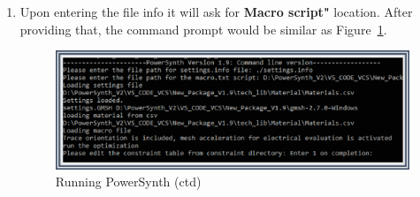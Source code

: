 \documentclass[11pt]{article}
\begin{document}
\begin{enumerate}
\begin{lstlisting} [caption={Settings file content},label={settings}]
    \end{lstlisting}
    
    \item Upon entering the file info it will ask for \textbf{Macro script"} location. After providing that, the command prompt would be similar as Figure~\ref{macro_6}.
    
    \begin{figure}[H]
    \centering
    \includegraphics[width=\linewidth ]{figs/v_1.9_figs/cmd_re_2.eps}
    \caption{Running PowerSynth (ctd)}
    \label{macro_6}
    \end{figure}
    

\end{enumerate}
\end{document}
